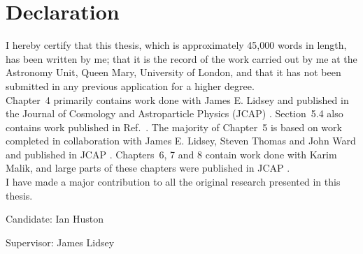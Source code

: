 \documentclass[a4paper,10pt]{article}
\title{}
\author{Ian Huston}
\begin{document}
\section*{Declaration}
\thispagestyle{empty}
I hereby certify that this thesis, which is approximately 45,000 words in length,
has been written by me; that it is the record of the work carried out by me at the
Astronomy Unit, Queen Mary, University of London, and that it has not been submitted
in any previous application for a higher degree.
\\
Chapter~4 primarily contains work done with James E.
Lidsey and published in the Journal of Cosmology and Astroparticle Physics (JCAP)
\cite{lidseyhuston}. Section~5.4 also contains work published
in Ref.~\cite{lidseyhuston}.
% 
The majority of Chapter~5 is based on work completed in
collaboration with James E. Lidsey, Steven Thomas and John Ward and published in JCAP
\cite{hltw}. 
% 
Chapters~6, 7 and 8 contain work
done with Karim Malik, and large parts of these chapters were published in JCAP
\cite{hustonmalik}.
\\
I have made a major contribution to all the original research presented in this
thesis.
\vfill
\begin{flushright}
Candidate: Ian Huston\\
\end{flushright}
\vfill
\begin{flushright}
Supervisor: James Lidsey
\end{flushright}

\vfill


\end{document}
